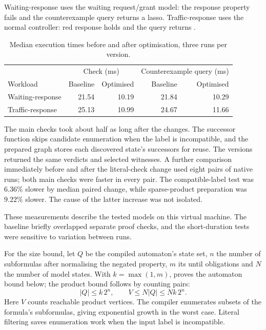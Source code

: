 Waiting-response uses the waiting request/grant model: the response property
fails and the counterexample query returns a lasso. Traffic-response uses
the normal controller: red response holds and the query returns .

\begin{table}[!ht]
  \centering
  \small
  \renewcommand{\arraystretch}{1.15}
  \begin{tabular}{@{}lrrrr@{}}
    \toprule
    & \multicolumn{2}{c}{Check (ms)}
    & \multicolumn{2}{c}{Counterexample query (ms)} \\
    Workload & Baseline & Optimised & Baseline & Optimised \\
    \midrule
    Waiting-response & 21.54 & 10.19 & 21.84 & 10.29 \\
    Traffic-response & 25.13 & 10.99 & 24.67 & 11.66 \\
    \bottomrule
  \end{tabular}
  \caption{Median execution times before and after optimisation, three runs per version.}
  \label{tab:historical-performance}
\end{table}

The main checks took about half as long after the changes. The successor
function skips candidate enumeration when the label is incompatible, and
the prepared graph stores each discovered state's successors for reuse. The versions returned
the same verdicts and selected witnesses. A further comparison immediately
before and after the literal-check change used eight pairs of native runs;
both main checks were faster in every pair. The compatible-label test was
$6.36\%$ slower by median paired change, while sparse-product preparation was
$9.22\%$ slower. The cause of the latter increase was not isolated.

These measurements describe the tested models on this virtual machine.
The baseline briefly overlapped separate proof checks, and the short-duration
tests were sensitive to variation between runs.

For the size bound, let $Q$ be the compiled automaton's state set, $n$ the
number of subformulas after normalising the negated property, $m$ its until
obligations and $N$ the number of model states.
With $k=\max(1,m)$,  proves the automaton bound below; the product
bound follows by counting pairs:
\[
  |Q|\le k\,2^n,\qquad V\le N|Q|\le Nk\,2^n.
\]
Here $V$ counts reachable product vertices. The compiler enumerates subsets
of the formula's subformulas, giving exponential growth in the worst case.
Literal filtering saves enumeration work when the input label is incompatible.

